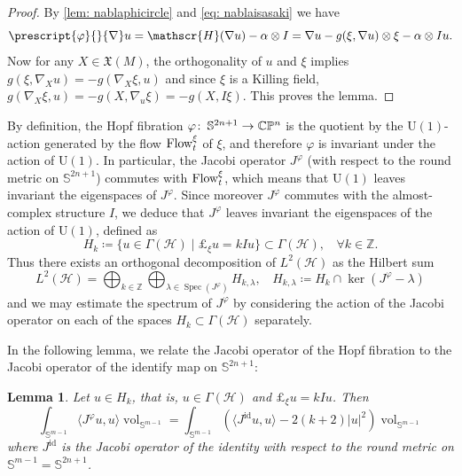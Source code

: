 \documentclass{article}
\numberwithin{equation}{section}        %
\theoremstyle{bfnote}
\newtheorem{lem}[thm]{Lemma}                %
\theoremstyle{definition}
\theoremstyle{bfremark}
\newcommand{\col}{\colon \thinspace}        %
\newcommand{\Z}{\mathbb{Z}}                 %
\newcommand{\C}{\mathbb{C}}                 %
\renewcommand{\P}{\mathbb{P}}               %
\newcommand{\Sp}{\mathbb{S}}                %
\DeclareMathOperator{\vol}{vol}                 %
\DeclareMathOperator{\Spec}{Spec}               %
\begin{document}
\begin{proof}
    By \cref{lem: nablaphicircle} and \eqref{eq: nablaisasaki} we have
    \begin{equation*}
        \prescript{\varphi}{}{\nabla} u = \mathscr{H}(\nabla u) - \alpha \otimes I = \nabla u - g(\xi,\nabla u) \otimes \xi - \alpha \otimes I u .
    \end{equation*}
    Now for any $X \in \mathfrak{X}(M)$, the orthogonality of $u$ and $\xi$ implies $g(\xi,\nabla_X u) = - g(\nabla_X \xi, u)$ and since $\xi$ is a Killing field, $g(\nabla_X \xi, u) = - g(X,\nabla_u \xi) = - g(X,I\xi)$. This proves the lemma.
\end{proof}

By definition, the Hopf fibration $\varphi \col \Sp^{2n+1} \to \C\P^{n}$ is the quotient by the $\mathrm{U}(1)$-action generated by the flow $\textup{Flow}_{t}^\xi$ of $\xi$, and therefore $\varphi$ is invariant under the action of $\mathrm{U}(1)$. In particular, the Jacobi operator $J^\varphi$ (with respect to the round metric on $\Sp^{2n+1}$) commutes with $\textup{Flow}_{t}^\xi$, which means that $\mathrm{U}(1)$ leaves invariant the eigenspaces of $J^\varphi$. Since moreover $J^\varphi$ commutes with the almost-complex structure $I$, we deduce that $J^\varphi$ leaves invariant the eigenspaces of the action of $\mathrm{U}(1)$, defined as
\begin{equation*}
    H_k \coloneqq \{ u \in \Gamma(\mathscr H) \mid \pounds_\xi u = kIu \} \subset \Gamma(\mathscr H), ~~~~ \forall k \in \Z .
\end{equation*}
Thus there exists an orthogonal decomposition of $L^2(\mathscr H)$ as the Hilbert sum
\begin{equation}
    L^2(\mathscr H) = \bigoplus_{k \in \Z} \bigoplus_{\lambda \in \Spec(J^\varphi)} H_{k,\lambda}, ~~~~ H_{k,\lambda} \coloneqq H_k \cap \ker(J^\varphi - \lambda)
\end{equation}
and we may estimate the spectrum of $J^\varphi$ by considering the action of the Jacobi operator on each of the spaces $H_k \subset \Gamma(\mathscr H)$ separately. 

In the following lemma, we relate the Jacobi operator of the Hopf fibration to the Jacobi operator of the identify map on $\Sp^{2n+1}$:

\begin{lem}     \label{lem: Jacobi operator of Hopf vs identity}
    Let $u \in H_k$, that is, $u \in \Gamma(\mathscr H)$ and $\pounds_\xi u = kIu$. Then
    \begin{equation*}
        \int_{\Sp^{m-1}} \langle J^\varphi u, u \rangle \vol_{\Sp^{m-1}} = \int_{\Sp^{m-1}} (\langle J^{\mathrm{id}} u, u \rangle - 2(k+2) |u|^2) \vol_{\Sp^{m-1}}
    \end{equation*}
    where $J^{\mathrm{id}}$ is the Jacobi operator of the identity with respect to the round metric on $\Sp^{m-1} = \Sp^{2n+1}$.
\end{lem}
\end{document}
